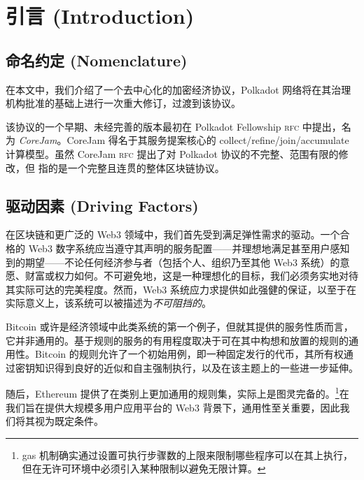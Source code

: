 \section{引言 (Introduction)}

\subsection{命名约定 (Nomenclature)}


在本文中，我们介绍了一个去中心化的加密经济协议，Polkadot 网络将在其治理机构批准的基础上进行一次重大修订，过渡到该协议。

该协议的一个早期、未经完善的版本最初在 Polkadot Fellowship \textsc{rfc} 中提出，名为 \emph{CoreJam}。CoreJam 得名于其服务提案核心的 collect/refine/join/accumulate 计算模型。虽然 CoreJam \textsc{rfc} 提出了对 Polkadot 协议的不完整、范围有限的修改，但 \Jam 指的是一个完整且连贯的整体区块链协议。

\subsection{驱动因素 (Driving Factors)}

在区块链和更广泛的 Web3 领域中，我们首先受到满足弹性需求的驱动。一个合格的 Web3 数字系统应当遵守其声明的服务配置——并理想地满足甚至用户感知到的期望——不论任何经济参与者（包括个人、组织乃至其他 Web3 系统）的意愿、财富或权力如何。不可避免地，这是一种理想化的目标，我们必须务实地对待其实际可达的完美程度。然而，Web3 系统应力求提供如此强健的保证，以至于在实际意义上，该系统可以被描述为\emph{不可阻挡的}。

Bitcoin 或许是经济领域中此类系统的第一个例子，但就其提供的服务性质而言，它并非通用的。基于规则的服务的有用程度取决于可在其中构想和放置的规则的通用性。Bitcoin 的规则允许了一个初始用例，即一种固定发行的代币，其所有权通过密钥知识得到良好的近似和自主强制执行，以及在该主题上的一些进一步延伸。

随后，Ethereum 提供了在类别上更加通用的规则集，实际上是图灵完备的。\footnote{gas 机制确实通过设置可执行步骤数的上限来限制哪些程序可以在其上执行，但在无许可环境中必须引入某种限制以避免无限计算。}在我们旨在提供大规模多用户应用平台的 Web3 背景下，通用性至关重要，因此我们将其视为既定条件。

